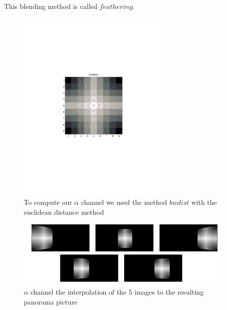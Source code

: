 \documentclass[subfigure,epsfig,fleqn,float,numbers=noenddot]{scrartcl}
\begin{document}
This blending method is called $feathering$.
	\begin{figure}[H]
		\centering
		\includegraphics[width=0.65\textwidth]{./img/bwdist.pdf}
		\caption{To compute our $\alpha$ channel we used the method $bwdist$ with the euclidean distance method}
		\label{img:bwdist}
	\end{figure}
	\begin{figure}[H]
		\centering
		\includegraphics[width=0.95\textwidth]{./img/interpolationImg.png}
		\caption{$\alpha$ channel the interpolation of the 5 images to the resulting panorama picture}
		\label{img:interpolation}
	\end{figure}
	
\end{document}
